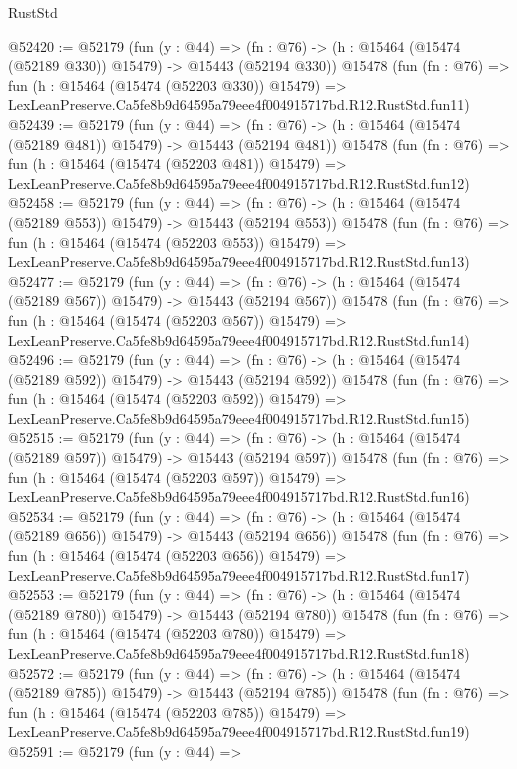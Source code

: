 \begin{lexlean}{RustStd}
\begin{coremodule}
@52420 := @52179
    (fun (y : @44) =>
    (fn : @76) -> (h : @15464 (@15474 (@52189 @330)) @15479) -> @15443 (@52194 @330))
    @15478
    (fun (fn : @76) =>
    fun (h : @15464 (@15474 (@52203 @330)) @15479) =>
    LexLeanPreserve.Ca5fe8b9d64595a79eee4f004915717bd.R12.RustStd.fun11)
@52439 := @52179
    (fun (y : @44) =>
    (fn : @76) -> (h : @15464 (@15474 (@52189 @481)) @15479) -> @15443 (@52194 @481))
    @15478
    (fun (fn : @76) =>
    fun (h : @15464 (@15474 (@52203 @481)) @15479) =>
    LexLeanPreserve.Ca5fe8b9d64595a79eee4f004915717bd.R12.RustStd.fun12)
@52458 := @52179
    (fun (y : @44) =>
    (fn : @76) -> (h : @15464 (@15474 (@52189 @553)) @15479) -> @15443 (@52194 @553))
    @15478
    (fun (fn : @76) =>
    fun (h : @15464 (@15474 (@52203 @553)) @15479) =>
    LexLeanPreserve.Ca5fe8b9d64595a79eee4f004915717bd.R12.RustStd.fun13)
@52477 := @52179
    (fun (y : @44) =>
    (fn : @76) -> (h : @15464 (@15474 (@52189 @567)) @15479) -> @15443 (@52194 @567))
    @15478
    (fun (fn : @76) =>
    fun (h : @15464 (@15474 (@52203 @567)) @15479) =>
    LexLeanPreserve.Ca5fe8b9d64595a79eee4f004915717bd.R12.RustStd.fun14)
@52496 := @52179
    (fun (y : @44) =>
    (fn : @76) -> (h : @15464 (@15474 (@52189 @592)) @15479) -> @15443 (@52194 @592))
    @15478
    (fun (fn : @76) =>
    fun (h : @15464 (@15474 (@52203 @592)) @15479) =>
    LexLeanPreserve.Ca5fe8b9d64595a79eee4f004915717bd.R12.RustStd.fun15)
@52515 := @52179
    (fun (y : @44) =>
    (fn : @76) -> (h : @15464 (@15474 (@52189 @597)) @15479) -> @15443 (@52194 @597))
    @15478
    (fun (fn : @76) =>
    fun (h : @15464 (@15474 (@52203 @597)) @15479) =>
    LexLeanPreserve.Ca5fe8b9d64595a79eee4f004915717bd.R12.RustStd.fun16)
@52534 := @52179
    (fun (y : @44) =>
    (fn : @76) -> (h : @15464 (@15474 (@52189 @656)) @15479) -> @15443 (@52194 @656))
    @15478
    (fun (fn : @76) =>
    fun (h : @15464 (@15474 (@52203 @656)) @15479) =>
    LexLeanPreserve.Ca5fe8b9d64595a79eee4f004915717bd.R12.RustStd.fun17)
@52553 := @52179
    (fun (y : @44) =>
    (fn : @76) -> (h : @15464 (@15474 (@52189 @780)) @15479) -> @15443 (@52194 @780))
    @15478
    (fun (fn : @76) =>
    fun (h : @15464 (@15474 (@52203 @780)) @15479) =>
    LexLeanPreserve.Ca5fe8b9d64595a79eee4f004915717bd.R12.RustStd.fun18)
@52572 := @52179
    (fun (y : @44) =>
    (fn : @76) -> (h : @15464 (@15474 (@52189 @785)) @15479) -> @15443 (@52194 @785))
    @15478
    (fun (fn : @76) =>
    fun (h : @15464 (@15474 (@52203 @785)) @15479) =>
    LexLeanPreserve.Ca5fe8b9d64595a79eee4f004915717bd.R12.RustStd.fun19)
@52591 := @52179
    (fun (y : @44) =>

\end{coremodule}
\end{lexlean}
